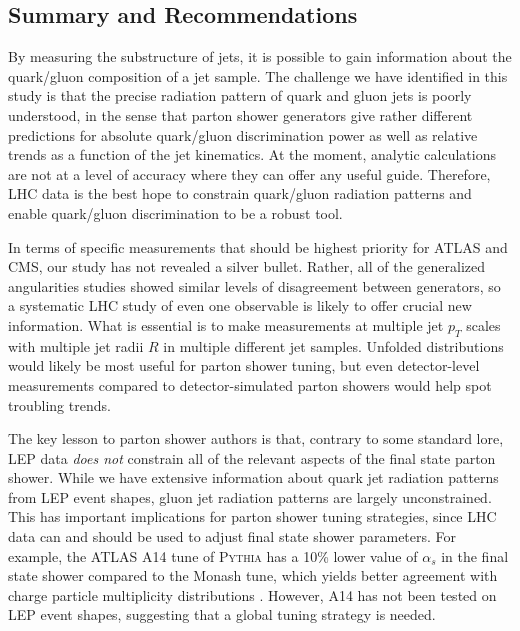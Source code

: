 \documentclass[11pt]{cernrep}
\begin{document}
\subsection{Summary and Recommendations}
\label{quarkgluon_sec:conclude}

By measuring the substructure of jets, it is possible to gain information about the quark/gluon composition of a jet sample.  The challenge we have identified in this study is that the precise radiation pattern of quark and gluon jets is poorly understood, in the sense that parton shower generators give rather different predictions for absolute quark/gluon discrimination power as well as relative trends as a function of the jet kinematics.  At the moment, analytic calculations are not at a level of accuracy where they can offer any useful guide.  Therefore, LHC data is the best hope to constrain quark/gluon radiation patterns and enable quark/gluon discrimination to be a robust tool.

In terms of specific measurements that should be highest priority for ATLAS and CMS, our study has not revealed a silver bullet.  Rather, all of the generalized angularities studies showed similar levels of disagreement between generators, so a systematic LHC study of even one observable is likely to offer crucial new information.  What is essential is to make measurements at multiple jet $p_T$ scales with multiple jet radii $R$ in multiple different jet samples.  Unfolded distributions would likely be most useful for parton shower tuning, but even detector-level measurements compared to detector-simulated parton showers would help spot troubling trends.

The key lesson to parton shower authors is that, contrary to some standard lore, LEP data \emph{does not} constrain all of the relevant aspects of the final state parton shower.  While we have extensive information about quark jet radiation patterns from LEP event shapes, gluon jet radiation patterns are largely unconstrained.  This has important implications for parton shower tuning strategies, since LHC data can and should be used to adjust final state shower parameters.  For example, the ATLAS A14 tune of \textsc{Pythia} has a 10\% lower value of $\alpha_s$ in the final state shower compared to the Monash tune, which yields better agreement with charge particle multiplicity distributions \cite{Aad:2016oit}.  However, A14 has not been tested on LEP event shapes, suggesting that a global tuning strategy is needed.
\end{document}
